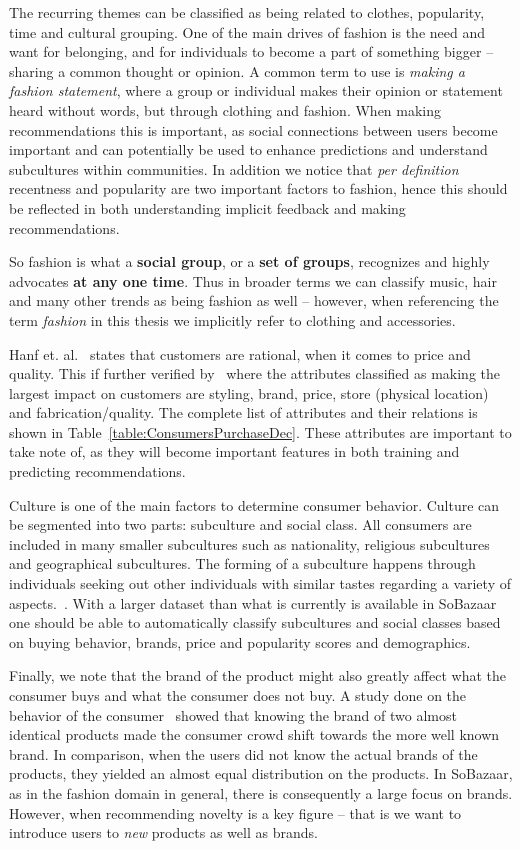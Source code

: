 The recurring themes can be classified as being related to clothes, popularity,
time and cultural grouping. One of the main drives of fashion is the need and
want for belonging, and for individuals to become a part of something bigger
-- sharing a common thought or opinion. A common term to use is \textit{making a
fashion statement}, where a group or individual makes their opinion or
statement heard without words, but through clothing and fashion. When making
recommendations this is important, as social connections between users become
important and can potentially be used to enhance predictions and understand
subcultures within communities. In addition we notice that \textit{per
definition} recentness and popularity are two important factors to fashion,
hence this should be reflected in both understanding implicit feedback and
making recommendations.

So fashion is what a \textbf{social group}, or a \textbf{set of groups},
recognizes and highly advocates \textbf{at any one time}. Thus in broader
terms we can classify music, hair and many other trends as being fashion as
well -- however, when referencing the term \textit{fashion} in this thesis we
implicitly refer to clothing and accessories.

Hanf et. al.~\cite{Hanf1994} states that customers are rational, when it comes
to price and quality. This if further verified by~\cite{dutton2006} where the
attributes classified as making the largest impact on customers are styling,
brand, price, store (physical location) and fabrication/quality. The complete
list of attributes and their relations is shown in
Table~\ref{table:ConsumersPurchaseDec}. These attributes are important to take
note of, as they will become important features in both training and predicting
recommendations.

Culture is one of the main factors to determine consumer behavior.  Culture can
be segmented into two parts: subculture and social class. All consumers are
included in many smaller subcultures such as nationality, religious subcultures
and geographical subcultures. The forming of a subculture happens through
individuals seeking out other individuals with similar tastes regarding a
variety of aspects.~\cite{vignali2009fashion}. With a larger dataset than what
is currently is available in SoBazaar one should be able to automatically
classify subcultures and social classes based on buying behavior, brands,
price and popularity scores and demographics.

Finally, we note that the brand of the product might also greatly affect what
the consumer buys and what the consumer does not buy. A study done on the
behavior of the consumer~\cite{deLace2010} showed that knowing the brand of two
almost identical products made the consumer crowd shift towards the more well
known brand. In comparison, when the users did not know the actual brands of
the products, they yielded an almost equal distribution on the products. In
SoBazaar, as in the fashion domain in general, there is consequently a large
focus on brands. However, when recommending novelty is a key figure -- that is
we want to introduce users to \textit{new} products as well as brands.

